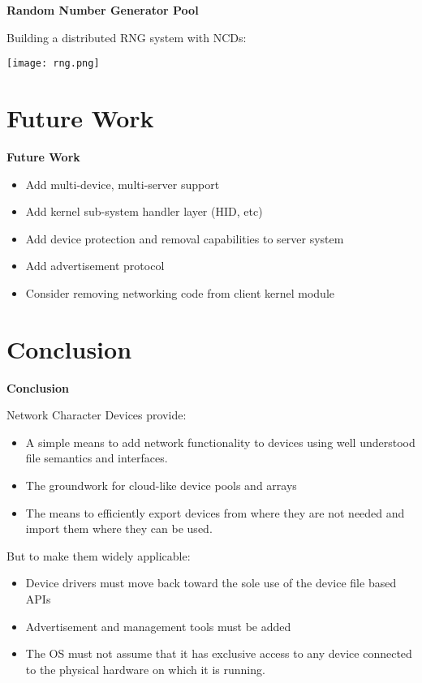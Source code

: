 \documentclass[handout]{beamer}
\begin{document}
\begin{frame}{\bf Random Number Generator Pool}

Building a distributed RNG system with NCDs:

  \begin{center}
    \texttt{[image: rng.png]}
  \end{center}

\end{frame}

\section{Future Work}
\begin{frame}{\bf Future Work}

\begin{itemize}
\item<1-> Add multi-device, multi-server support
\item<2-> Add kernel sub-system handler layer (HID, etc)
\item<3-> Add device protection and removal capabilities to server system
\item<4-> Add advertisement protocol
\item<5-> Consider removing networking code from client kernel module
\end{itemize}

\end{frame}

\section{Conclusion}

\begin{frame}{\bf Conclusion}

Network Character Devices provide:

\begin{itemize}
\item<1-> A simple means to add network functionality to devices using
  well understood file semantics and interfaces.
\item<2-> The groundwork for cloud-like device pools and arrays
\item<3-> The means to efficiently export devices from where they are not
  needed and import them where they can be used.
\end{itemize}

But to make them widely applicable:

\begin{itemize}
\item<4-> Device drivers must move back toward the sole use of the
  device file based APIs
\item<5-> Advertisement and management tools must be added
\item<6-> The OS must not assume that it has exclusive access to any
  device connected to the physical hardware on which it is running.
\end{itemize}

\end{frame}
\end{document}
